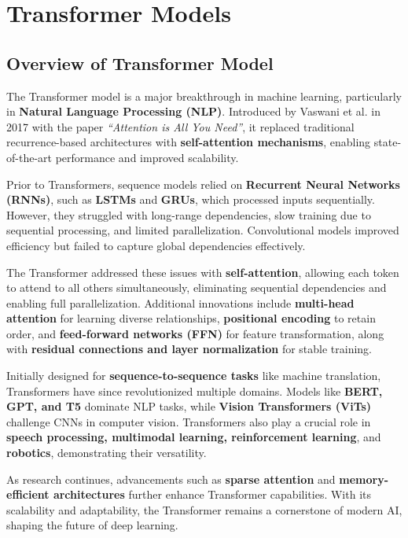 \chapter{Transformer Models}

\section{Overview of Transformer Model}

The Transformer model is a major breakthrough in machine learning, particularly in \textbf{Natural Language Processing (NLP)}. Introduced by Vaswani et al. in 2017 with the paper \textit{“Attention is All You Need”}, it replaced traditional recurrence-based architectures with \textbf{self-attention mechanisms}, enabling state-of-the-art performance and improved scalability.

Prior to Transformers, sequence models relied on \textbf{Recurrent Neural Networks (RNNs)}, such as \textbf{LSTMs} and \textbf{GRUs}, which processed inputs sequentially. However, they struggled with long-range dependencies, slow training due to sequential processing, and limited parallelization. Convolutional models improved efficiency but failed to capture global dependencies effectively.

The Transformer addressed these issues with \textbf{self-attention}, allowing each token to attend to all others simultaneously, eliminating sequential dependencies and enabling full parallelization. Additional innovations include \textbf{multi-head attention} for learning diverse relationships, \textbf{positional encoding} to retain order, and \textbf{feed-forward networks (FFN)} for feature transformation, along with \textbf{residual connections and layer normalization} for stable training.

Initially designed for \textbf{sequence-to-sequence tasks} like machine translation, Transformers have since revolutionized multiple domains. Models like \textbf{BERT, GPT, and T5} dominate NLP tasks, while \textbf{Vision Transformers (ViTs)} challenge CNNs in computer vision. Transformers also play a crucial role in \textbf{speech processing, multimodal learning, reinforcement learning}, and \textbf{robotics}, demonstrating their versatility.

As research continues, advancements such as \textbf{sparse attention} and \textbf{memory-efficient architectures} further enhance Transformer capabilities. With its scalability and adaptability, the Transformer remains a cornerstone of modern AI, shaping the future of deep learning.

